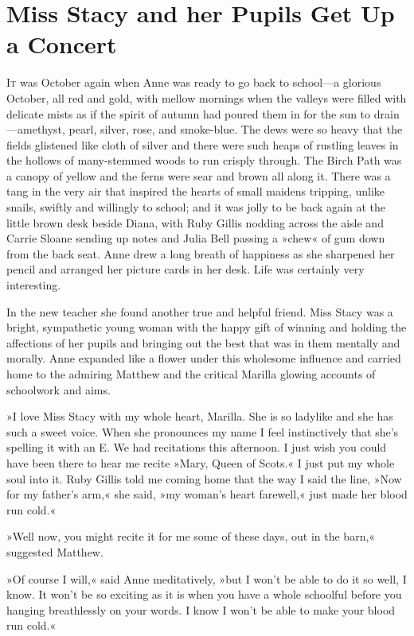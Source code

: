 \chapter{Miss Stacy and her Pupils Get Up a Concert}

\lettrine[lines=4]{I}{t} was October again when Anne was ready to go back to school—a glorious October, all red and gold, with mellow mornings when the valleys were filled with delicate mists as if the spirit of autumn had poured them in for the sun to drain—amethyst, pearl, silver, rose, and smoke-blue. The dews were so heavy that the fields glistened like cloth of silver and there were such heaps of rustling leaves in the hollows of many-stemmed woods to run crisply through. The Birch Path was a canopy of yellow and the ferns were sear and brown all along it. There was a tang in the very air that inspired the hearts of small maidens tripping, unlike snails, swiftly and willingly to school; and it was jolly to be back again at the little brown desk beside Diana, with Ruby Gillis nodding across the aisle and Carrie Sloane sending up notes and Julia Bell passing a »chew« of gum down from the back seat. Anne drew a long breath of happiness as she sharpened her pencil and arranged her picture cards in her desk. Life was certainly very interesting.

In the new teacher she found another true and helpful friend. Miss Stacy was a bright, sympathetic young woman with the happy gift of winning and holding the affections of her pupils and bringing out the best that was in them mentally and morally. Anne expanded like a flower under this wholesome influence and carried home to the admiring Matthew and the critical Marilla glowing accounts of schoolwork and aims.

»I love Miss Stacy with my whole heart, Marilla. She is so ladylike and she has such a sweet voice. When she pronounces my name I feel instinctively that she’s spelling it with an E. We had recitations this afternoon. I just wish you could have been there to hear me recite »Mary, Queen of Scots.« I just put my whole soul into it. Ruby Gillis told me coming home that the way I said the line, »Now for my father's arm,« she said, »my woman's heart farewell,« just made her blood run cold.«

»Well now, you might recite it for me some of these days, out in the barn,« suggested Matthew.

»Of course I will,« said Anne meditatively, »but I won’t be able to do it so well, I know. It won’t be so exciting as it is when you have a whole schoolful before you hanging breathlessly on your words. I know I won’t be able to make your blood run cold.«

